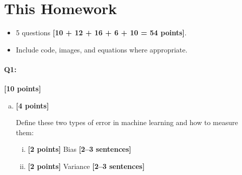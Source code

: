 \section*{This Homework}
\begin{itemize}
    \item 5 questions \textbf{[10 + 12 + 16 + 6 + 10 = 54 points]}.
    \item Include code, images, and equations where appropriate.
\end{itemize}


\pagebreak
\paragraph{Q1:} \textbf{[10 points]}

\begin{enumerate} [(a)]
    \item \textbf{[4 points]}
    \begin{tcolorbox}[colback=orange!5!white,colframe=orange!75!black]
    Define these two types of error in machine learning and how to measure them:
    \end{tcolorbox}

    \begin{enumerate} [(i)]
    \item \textbf{[2 points]} Bias \textbf{[2--3 sentences]}

    \item \textbf{[2 points]} Variance \textbf{[2--3 sentences]}
    

\end{enumerate}
\end{enumerate}
